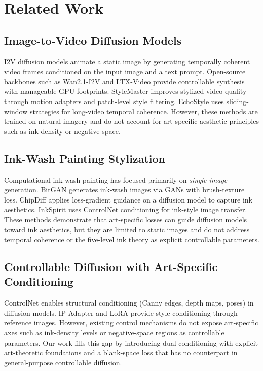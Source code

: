 \section{Related Work}
\label{sec:related}

\subsection{Image-to-Video Diffusion Models}

I2V diffusion models animate a static image by generating
temporally coherent video frames conditioned on the input image
and a text prompt. Open-source backbones such as Wan2.1-I2V
and LTX-Video provide controllable synthesis with manageable GPU
footprints. StyleMaster \citep{ye2025stylemaster} improves
stylized video quality through motion adapters and patch-level
style filtering. EchoStyle \citep{li2026echostyle} uses
sliding-window strategies for long-video temporal coherence.
However, these methods are trained on natural imagery and do not
account for art-specific aesthetic principles such as ink density
or negative space.

\subsection{Ink-Wash Painting Stylization}

Computational ink-wash painting has focused primarily on
\emph{single-image} generation. BitGAN \citep{he2023bitgan}
generates ink-wash images via GANs with brush-texture loss.
ChipDiff \citep{liu2026chipdiff} applies loss-gradient guidance on
a diffusion model to capture ink aesthetics. InkSpirit
\citep{zhang2025inkspirit} uses ControlNet conditioning for
ink-style image transfer. These methods demonstrate that
art-specific losses can guide diffusion models toward ink
aesthetics, but they are limited to static images and do not
address temporal coherence or the five-level ink theory as
explicit controllable parameters.

\subsection{Controllable Diffusion with Art-Specific Conditioning}

ControlNet \citep{zhang2023controlnet} enables structural
conditioning (Canny edges, depth maps, poses) in diffusion models.
IP-Adapter and LoRA \citep{hu2022lora} provide style conditioning
through reference images. However, existing control mechanisms do
not expose art-specific axes such as ink-density levels or
negative-space regions as controllable parameters. Our work fills
this gap by introducing dual conditioning with explicit
art-theoretic foundations and a blank-space loss that has no
counterpart in general-purpose controllable diffusion.

